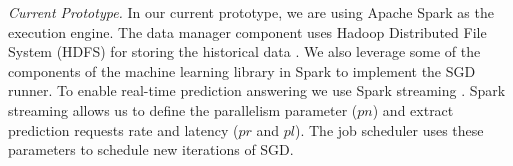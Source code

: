 \textit{Current Prototype.}
In our current prototype, we are using Apache Spark \cite{zaharia2010spark} as the execution engine.
The data manager component uses Hadoop Distributed File System (HDFS) for storing the historical data \cite{shvachko2010hadoop}.
We also leverage some of the components of the machine learning library in Spark to implement the SGD runner.
To enable real-time prediction answering we use Spark streaming \cite{zaharia2013discretized}.
Spark streaming allows us to define the parallelism parameter ($pn$) and extract prediction requests rate and latency ($pr$ and $pl$).
The job scheduler uses these parameters to schedule new iterations of SGD.
